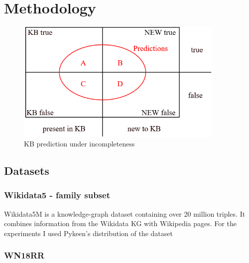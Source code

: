 \chapter{Methodology}

\begin{figure}[htp]
    \centering
    \includegraphics[width=10cm]{figures/kb_venn.png}
    \caption{KB prediction under incompleteness}
\end{figure}


\section{Datasets}
\subsection{Wikidata5 - family subset}
Wikidata5M is a knowledge-graph dataset containing over 20 million triples. It combines information from the Wikidata KG with Wikipedia pages. For the experiments I used Pykeen's distribution of the dataset
\cite{wang2019kepler}
\subsection{WN18RR}

